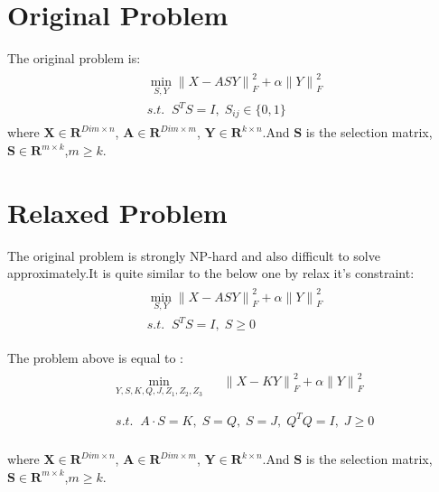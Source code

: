 \documentclass{article}
\begin{document}
\section{Original Problem}
  The original problem is\;:
\begin{eqnarray}
\begin{array}{l}
    \mathop{\min}\limits_{S, Y} {\parallel X - ASY\parallel}_F^2 + \alpha{\parallel Y\parallel}_F^2\\
    s.t. \;\; S^TS = I, \; S_{ij} \in \{0,1\}
\end{array}
\end{eqnarray}
where $\mathbf{X} \in \mathbf{R}^{Dim\times n}$, $\mathbf{A} \in \mathbf{R}^{Dim \times m}$, $\mathbf{Y} \in \mathbf{R}^{k\times n}$.And $\mathbf{S}$ is the selection matrix, $\mathbf{S} \in \mathbf{R}^{m\times k}$,$m \geq k$.

\section{Relaxed Problem}
  The original problem is strongly NP-hard and also difficult to solve approximately.It is quite similar to the below one by relax it's constraint\;:
\begin{eqnarray}
\begin{array}{l}
    \mathop{\min}\limits_{S, Y} {\parallel X - ASY\parallel}_F^2 + \alpha{\parallel Y\parallel}_F^2\\
    s.t. \;\; S^TS = I, \; S \geq 0
\end{array}
\end{eqnarray}

The problem above is equal to \;:
\begin{eqnarray}
&& \begin{array}{lll}
\mathop{\min}\limits_{Y,S,K,Q,J,Z_1,Z_2,Z_3 } && {\parallel X - KY\parallel}_F^2  + \alpha{\parallel Y\parallel}_F^2
\end{array}\\ \nonumber \\
&& \begin{array}{lll}
s.t. \;\; A\cdot S =K , \; S = Q , \; S = J , \; Q^TQ = I , \; J \geq 0 \nonumber
\end{array}
\end{eqnarray}\\
where $\mathbf{X} \in \mathbf{R}^{Dim\times n}$, $\mathbf{A} \in \mathbf{R}^{Dim \times m}$, $\mathbf{Y} \in \mathbf{R}^{k\times n}$.And $\mathbf{S}$ is the selection matrix, $\mathbf{S} \in \mathbf{R}^{m\times k}$,$m \geq k$.
\end{document}
